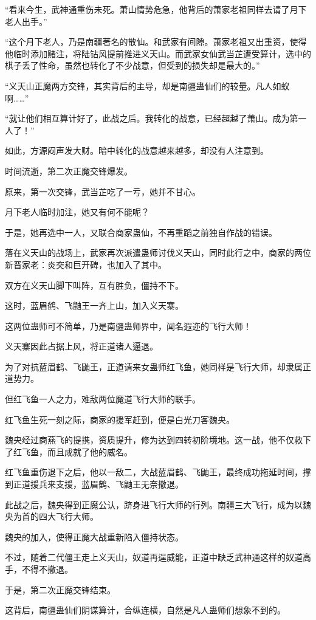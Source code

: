 \begin{this_body}
“看来今生，武神通重伤未死。萧山情势危急，他背后的萧家老祖同样去请了月下老人出手。”

“这个月下老人，乃是南疆著名的散仙。和武家有间隙。萧家老祖又出重资，使得他临时添加赌注，将陆钻风提前推进义天山。而武家女仙武当芷遭受算计，选中的棋子丢了性命，虽然也转化了不少战意，但受到的损失却是最大的。”

“义天山正魔两方交锋，其实背后的主导，却是南疆蛊仙们的较量。凡人如蚁啊……”

“就让他们相互算计好了，此战之后。我转化的战意，已经超越了萧山。成为第一人了！”

如此，方源闷声发大财。暗中转化的战意越来越多，却没有人注意到。

时间流逝，第二次正魔交锋爆发。

原来，第一次交锋，武当芷吃了一亏，她并不甘心。

月下老人临时加注，她又有何不能呢？

于是，她再选中一人，又联合商家蛊仙，不再重蹈之前独自作战的错误。

落在义天山的战场上，武家再次派遣蛊师讨伐义天山，同时此行之中，商家的两位新晋家老：炎突和巨开碑，也加入了其中。

双方在义天山脚下叫阵，互有胜负，僵持不下。

这时，蓝眉鹤、飞鼬王一齐上山，加入义天寨。

这两位蛊师可不简单，乃是南疆蛊师界中，闻名遐迩的飞行大师！

义天寨因此占据上风，将正道诸人逼退。

为了对抗蓝眉鹤、飞鼬王，正道请来女蛊师红飞鱼，她同样是飞行大师，却隶属正道势力。

但红飞鱼一人之力，难敌两位魔道飞行大师的联手。

红飞鱼生死一刻之际，商家的援军赶到，便是白光刀客魏央。

魏央经过商燕飞的提携，资质提升，修为达到四转初阶境地。这一战，他不仅救下了红飞鱼，而且成就了他的威名。

红飞鱼重伤退下之后，他以一敌二，大战蓝眉鹤、飞鼬王，最终成功拖延时间，撑到正道援兵来支援，蓝眉鹤、飞鼬王无奈撤退。

此战之后，魏央得到正魔公认，跻身进飞行大师的行列。南疆三大飞行，成为以魏央为首的四大飞行大师。

魏央的加入，使得正魔大战重新陷入僵持状态。

不过，随着二代僵王走上义天山，奴道再逞威能，正道中缺乏武神通这样的奴道高手，不得不撤退。

于是，第二次正魔交锋结束。

这背后，南疆蛊仙们阴谋算计，合纵连横，自然是凡人蛊师们想象不到的。


\end{this_body}
